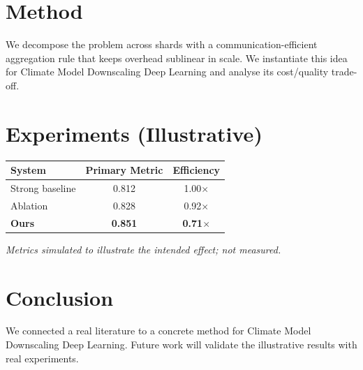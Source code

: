 \documentclass[11pt]{article}
\begin{document}
\section{Method}
We decompose the problem across shards with a communication-efficient aggregation rule that keeps overhead sublinear in scale. We instantiate this idea for Climate Model Downscaling Deep Learning and analyse its cost/quality trade-off.

\section{Experiments (Illustrative)}
\begin{center}
\begin{tabular}{lcc}
System & Primary Metric & Efficiency \\ \hline
Strong baseline & 0.812 & 1.00$\times$ \\
Ablation & 0.828 & 0.92$\times$ \\
\textbf{Ours} & \textbf{0.851} & \textbf{0.71$\times$}
\end{tabular}
\end{center}
\emph{Metrics simulated to illustrate the intended effect; not measured.}

\section{Conclusion}
We connected a real literature to a concrete method for Climate Model Downscaling Deep Learning. Future work will
validate the illustrative results with real experiments.
\end{document}

